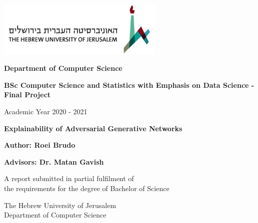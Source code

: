 \begin{titlepage}
    \begin{center}
        \vspace*{0.1cm}
        
          
        \includegraphics[width=0.6\textwidth]{images/logo.png}
        
        \large
         \textbf{Department of Computer Science}
         \vspace{1cm}
         
         \textbf{BSc Computer Science and Statistics with Emphasis on Data Science  - Final Project}
         \vspace{1cm}
         
         Academic Year 2020 - 2021
         
         
         \vspace{2cm}
        
        
        \LARGE
        \textbf{Explainability of Adversarial Generative Networks}
        
        
        \vspace{1.5cm}
        \large
        \textbf{Author: Roei Brudo}
        
                
        \vspace{1.5cm}
        \large
        \textbf{Advisors: Dr. Matan Gavish}
        
        
        
        \vspace{1.5cm}
        A report submitted in partial fulfilment of \\ the requirements for the degree of 
Bachelor of Science

        
        \vspace{0.8cm}
      \begin{flushright}
        \footnotesize
        The Hebrew University of Jerusalem\\
        Department of Computer Science\\
        \end{flushright}
        
    \end{center}
\end{titlepage}